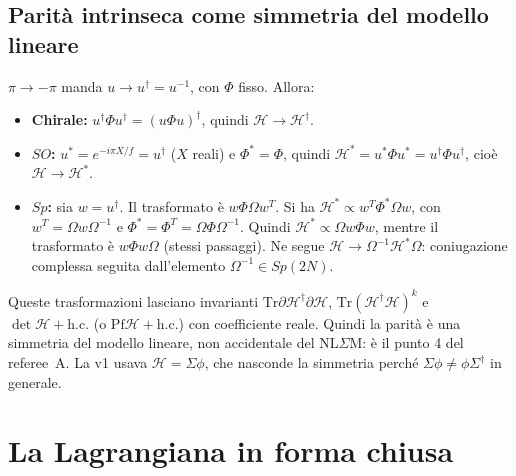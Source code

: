 \documentclass[11pt,a4paper]{article}
\numberwithin{equation}{section}
\theoremstyle{remark}
\newcommand{\Tr}{\mathrm{Tr}}
\newcommand{\Hf}{\mathcal{H}}
\begin{document}
\subsection{Parità intrinseca come simmetria del modello lineare}

$\pi\to-\pi$ manda $u\to u^\dagger=u^{-1}$, con $\Phi$ fisso. Allora:
\begin{itemize}
\item \textbf{Chirale:} $u^\dagger\Phi u^\dagger=(u\Phi u)^\dagger$, quindi $\Hf\to\Hf^\dagger$.
\item \textbf{$SO$:} $u^*=e^{-i\pi X/f}=u^\dagger$ ($X$ reali) e $\Phi^*=\Phi$, quindi $\Hf^*=u^*\Phi u^*=u^\dagger\Phi u^\dagger$, cioè $\Hf\to\Hf^*$.
\item \textbf{$Sp$:} sia $w=u^\dagger$. Il trasformato è $w\Phi\Omega w^T$. Si ha $\Hf^*\propto w^T\Phi^*\Omega w$, con $w^T=\Omega w\Omega^{-1}$ e $\Phi^*=\Phi^T=\Omega\Phi\Omega^{-1}$. Quindi $\Hf^*\propto\Omega w\Phi w$, mentre il trasformato è $w\Phi w\Omega$ (stessi passaggi). Ne segue $\Hf\to\Omega^{-1}\Hf^*\Omega$: coniugazione complessa seguita dall'elemento $\Omega^{-1}\in Sp(2N)$.
\end{itemize}
Queste trasformazioni lasciano invarianti $\Tr\partial\Hf^\dagger\partial\Hf$, $\Tr(\Hf^\dagger\Hf)^k$ e $\det\Hf+\mathrm{h.c.}$ (o $\mathrm{Pf}\Hf+\mathrm{h.c.}$) con coefficiente reale. Quindi la parità è una simmetria del modello lineare, non accidentale del NL$\Sigma$M: è il punto 4 del referee~A. La v1 usava $\Hf=\Sigma\phi$, che nasconde la simmetria perché $\Sigma\phi\neq\phi\Sigma^\dagger$ in generale.

\section{La Lagrangiana in forma chiusa}
\label{sec:master}
\end{document}
